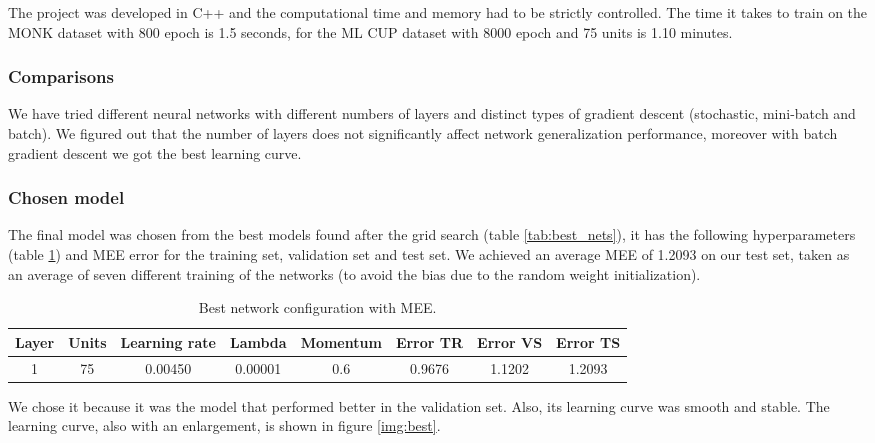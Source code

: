 The project was developed in C++ and the computational time and memory had to be strictly controlled.
The time it takes to train on the MONK dataset with 800 epoch is 1.5 seconds, for the ML CUP dataset with 8000 epoch and 75 units is 1.10 minutes.

\subsubsection{Comparisons}
We have tried different neural networks with different numbers of layers and distinct types of gradient descent (stochastic, mini-batch and batch). We figured out that the number of layers does not significantly affect network generalization performance, moreover with batch gradient descent we got the best learning curve.

\subsubsection{Chosen model}
The final model was chosen from the best models found after the grid search (table \ref{tab:best_nets}), it has the following hyperparameters (table \ref{tab:best_net}) and MEE error for the training set, validation set and test set.
We achieved an average MEE of 1.2093 on our test set, taken as an average of seven
different training of the networks (to avoid the bias due to the random weight
initialization).

\vspace{0.5cm}
\begin{center} 
\small\addtolength{\tabcolsep}{-3pt}
\begin{table}[h!]
	\centering
	\begin{tabular}{|c|c|c|c|c|c|c|c|}
		\hline
		\textbf{Layer}& \textbf{Units}& \textbf{Learning rate} & \multicolumn{1}{l|}{\textbf{Lambda}} & \textbf{Momentum} & \textbf{Error TR}& \textbf{Error VS}& \textbf{Error TS}\\ \hline
		1 & 75 & 0.00450 & 0.00001 & 0.6  & 0.9676 & 1.1202 & 1.2093  \\
		\hline
	\end{tabular}
	\caption{Best network configuration with MEE.}
	\label{tab:best_net}
\end{table}
\end{center}

We chose it because it was the model that performed better in the validation set. Also, its learning curve was smooth and stable.
The learning curve, also with an enlargement, is shown in figure \ref{img:best}.

